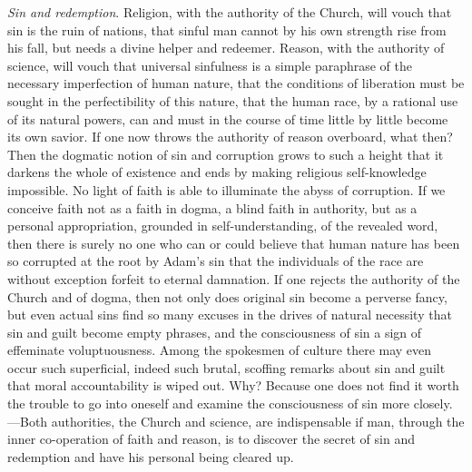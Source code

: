 \documentclass[12pt,a4paper,openany]{book}
\newcommand{\opage}[1]{\marginnote{\footnotesize\textit{[#1]}}}
\begin{document}
\emph{Sin and redemption}. Religion, with the authority of the Church,
will vouch that sin is the ruin of nations, that sinful man cannot by his
own strength rise from his fall, but needs a divine helper and redeemer.
Reason, with the authority of science, will vouch that universal
sinfulness is a simple paraphrase of the necessary imperfection of human
nature, that the conditions of liberation must be sought in the
perfectibility of this nature, that the human race, by a rational use of
its natural powers, can and must in the course of time little by little
become its own savior. If one now throws the authority of reason
overboard, what then? Then the dogmatic notion of sin and corruption
grows to such a height that it darkens the whole of existence and ends
by making religious self-knowledge impossible. No light of faith is able
to illuminate the abyss of corruption. If we conceive faith not as a
faith in dogma, a blind faith in authority, but as a personal
appropriation, grounded in self-understanding, of the revealed word,
then there is surely no one who can or could believe that human nature
has been so corrupted at the root by Adam's sin that the individuals of
the race are without exception forfeit to eternal damnation. If one
rejects the authority of the Church \opage{31}and of dogma, then not only does
original sin become a perverse fancy, but even actual sins find so many
excuses in the drives of natural necessity that sin and guilt become
empty phrases, and the consciousness of sin a sign of effeminate
voluptuousness. Among the spokesmen of culture there may even occur such
superficial, indeed such brutal, scoffing remarks about sin and guilt
that moral accountability is wiped out. Why? Because one does not find
it worth the trouble to go into oneself and examine the consciousness of
sin more closely.---Both authorities, the Church and science, are
indispensable if man, through the inner co-operation of faith and
reason, is to discover the secret of sin and redemption and have his
personal being cleared up.
\end{document}
